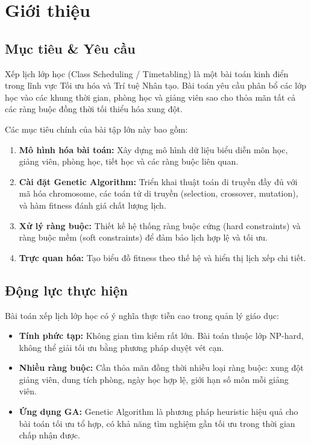 \section{Giới thiệu}

\subsection{Mục tiêu \& Yêu cầu}
Xếp lịch lớp học (Class Scheduling / Timetabling) là một bài toán kinh điển trong lĩnh vực Tối ưu hóa và Trí tuệ Nhân tạo. Bài toán yêu cầu phân bổ các lớp học vào các khung thời gian, phòng học và giảng viên sao cho thỏa mãn tất cả các ràng buộc đồng thời tối thiểu hóa xung đột.

Các mục tiêu chính của bài tập lớn này bao gồm:
\begin{enumerate}
    \item \textbf{Mô hình hóa bài toán:} Xây dựng mô hình dữ liệu biểu diễn môn học, giảng viên, phòng học, tiết học và các ràng buộc liên quan.
    \item \textbf{Cài đặt Genetic Algorithm:} Triển khai thuật toán di truyền đầy đủ với mã hóa chromosome, các toán tử di truyền (selection, crossover, mutation), và hàm fitness đánh giá chất lượng lịch.
    \item \textbf{Xử lý ràng buộc:} Thiết kế hệ thống ràng buộc cứng (hard constraints) và ràng buộc mềm (soft constraints) để đảm bảo lịch hợp lệ và tối ưu.
    \item \textbf{Trực quan hóa:} Tạo biểu đồ fitness theo thế hệ và hiển thị lịch xếp chi tiết.
\end{enumerate}

\subsection{Động lực thực hiện}
Bài toán xếp lịch lớp học có ý nghĩa thực tiễn cao trong quản lý giáo dục:
\begin{itemize}
    \item \textbf{Tính phức tạp:} Không gian tìm kiếm rất lớn. Bài toán thuộc lớp NP-hard, không thể giải tối ưu bằng phương pháp duyệt vét cạn.
    \item \textbf{Nhiều ràng buộc:} Cần thỏa mãn đồng thời nhiều loại ràng buộc: xung đột giảng viên, dung tích phòng, ngày học hợp lệ, giới hạn số môn mỗi giảng viên.
    \item \textbf{Ứng dụng GA:} Genetic Algorithm là phương pháp heuristic hiệu quả cho bài toán tối ưu tổ hợp, có khả năng tìm nghiệm gần tối ưu trong thời gian chấp nhận được.
\end{itemize}

